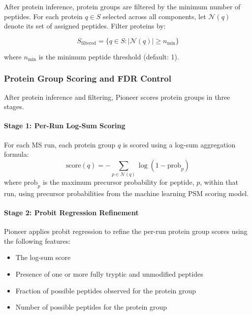 \documentclass[pdflatex,sn-nature]{sn-jnl}
\begin{document}
After protein inference, protein groups are filtered by the minimum number of peptides. For each protein $q \in S$ selected across all components, let $\mathcal{N}(q)$ denote its set of assigned peptides. Filter proteins by:

\begin{equation}
S_{\text{filtered}} = \{q \in S : |\mathcal{N}(q)| \geq n_{\text{min}}\}
\end{equation}

where $n_{\text{min}}$ is the minimum peptide threshold (default: 1).

\subsubsection{Protein Group Scoring and FDR Control}\label{subsubsec:protein-group-scoring-fdr}

After protein inference and filtering, Pioneer scores protein groups in three stages. 

\paragraph{Stage 1: Per-Run Log-Sum Scoring}\label{para:stage1-per-run-log-sum-scoring} For each MS run, each protein group $q$ is scored using a log-sum aggregation formula:
\begin{equation}
\text{score}(q) = -\sum_{p \in \mathcal{N}(q)} \log(1 - \text{prob}_p)
\end{equation}
where $\text{prob}_p$ is the maximum precursor probability for peptide, $p$, within that run, using precursor probabilities from the machine learning PSM scoring model.

\paragraph{Stage 2: Probit Regression Refinement}\label{para:stage2-probit-regression-refinement} Pioneer applies probit regression to refine the per-run protein group scores using the following features:
\begin{itemize}
  \item The log-sum score 
  \item Presence of one or more fully tryptic and unmodified peptides
  \item Fraction of possible peptides observed for the protein group 
  \item Number of possible peptides for the protein group
\end{itemize}
\end{document}
